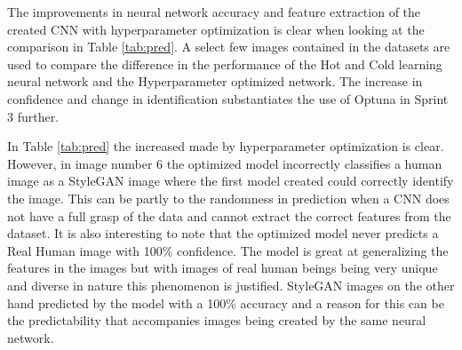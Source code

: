 The improvements in neural network accuracy and feature extraction of the created CNN with hyperparameter optimization is clear when looking at the comparison in Table \ref{tab:pred}. A select few images contained in the datasets are used to compare the difference in the performance of the Hot and Cold learning neural network and the Hyperparameter optimized network. The increase in confidence and change in identification substantiates the use of Optuna in Sprint 3 further.

\begin{table}[H]
\caption{Specific images comparison between the two CNN created}
\label{tab:pred}
\end{table}

In Table \ref{tab:pred} the increased made by hyperparameter optimization is clear. However, in image number 6 the optimized model incorrectly classifies a human image as a StyleGAN image where the first model created could correctly identify the image. This can be partly to the randomness in prediction when a CNN does not have a full grasp of the data and cannot extract the correct features from the dataset. It is also interesting to note that the optimized model never predicts a Real Human image with 100\% confidence. The model is great at generalizing the features in the images but with images of real human beings being very unique and diverse in nature this phenomenon is justified. StyleGAN images on the other hand predicted by the model with a 100\% accuracy and a reason for this can be the predictability that accompanies images being created by the same neural network.

